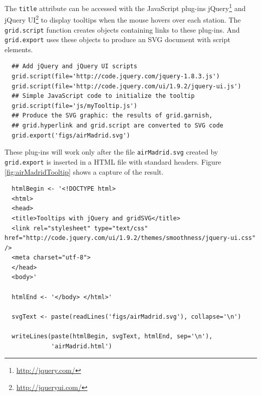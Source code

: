 The \texttt{title} attribute can be accessed with the JavaScript plug-ins
jQuery\footnote{\url{http://jquery.com/}} and jQuery UI\footnote{\url{http://jqueryui.com/}} to display tooltips when the mouse
hovers over each station. The \texttt{grid.script} function creates objects
containing links to these plug-ins. And \texttt{grid.export} uses these
objects to produce an SVG document with script elements.

\begin{LaTeX}
\end{LaTeX}

\lstset{language=r,label= ,caption= ,captionpos=b,numbers=none}
\begin{lstlisting}
  ## Add jQuery and jQuery UI scripts
  grid.script(file='http://code.jquery.com/jquery-1.8.3.js')
  grid.script(file='http://code.jquery.com/ui/1.9.2/jquery-ui.js')
  ## Simple JavaScript code to initialize the tooltip
  grid.script(file='js/myTooltip.js')
  ## Produce the SVG graphic: the results of grid.garnish,
  ## grid.hyperlink and grid.script are converted to SVG code
  grid.export('figs/airMadrid.svg')
\end{lstlisting}

These plug-ins will work only after the file \texttt{airMadrid.svg} created by
\texttt{grid.export} is inserted in a HTML file with standard headers. Figure
\ref{fig:airMadridTooltip} shows a capture of the result.

\lstset{language=r,label= ,caption= ,captionpos=b,numbers=none}
\begin{lstlisting}
  htmlBegin <- '<!DOCTYPE html>
  <html>
  <head>
  <title>Tooltips with jQuery and gridSVG</title>
  <link rel="stylesheet" type="text/css" href="http://code.jquery.com/ui/1.9.2/themes/smoothness/jquery-ui.css" />
  <meta charset="utf-8">
  </head>
  <body>'
  
  htmlEnd <- '</body> </html>'
    
  svgText <- paste(readLines('figs/airMadrid.svg'), collapse='\n')
    
  writeLines(paste(htmlBegin, svgText, htmlEnd, sep='\n'),
             'airMadrid.html')
\end{lstlisting}



